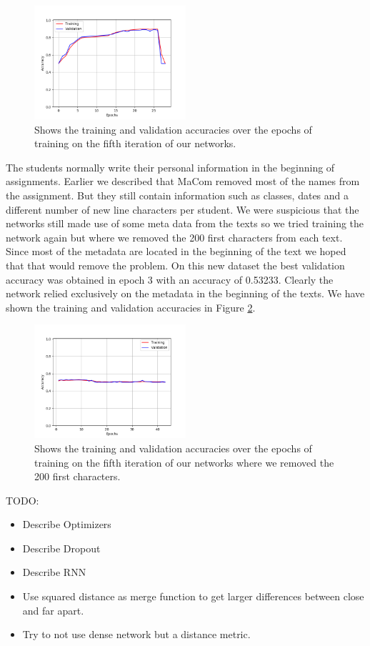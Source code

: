 \begin{figure}
    \centering
    \includegraphics[width=0.5\textwidth]{./pictures/experiments/network_5_accuracies.png}
    \caption{Shows the training and validation accuracies over the epochs of
        training on the fifth iteration of our networks.}
    \label{fig:network_5_accuracies}
\end{figure}

The students normally write their personal information in the beginning of
assignments. Earlier we described that MaCom removed most of the names from
the assignment. But they still contain information such as classes, dates and
a different number of new line characters per student. We were suspicious
that the networks still made use of some meta data from the texts so we tried
training the network again but where we removed the 200 first characters from
each text. Since most of the metadata are located in the beginning of the
text we hoped that that would remove the problem. On this new dataset the
best validation accuracy was obtained in epoch 3 with an accuracy of 0.53233.
Clearly the network relied exclusively on the metadata in the beginning of
the texts. We have shown the training and validation accuracies in Figure
\ref{fig:network_5_accuracies_2}.

\begin{figure}
    \centering
    \includegraphics[width=0.5\textwidth]{./pictures/experiments/network_5_accuracies_2.png}
    \caption{Shows the training and validation accuracies over the epochs of
        training on the fifth iteration of our networks where we removed the 200
        first characters.}
    \label{fig:network_5_accuracies_2}
\end{figure}

TODO:
\begin{itemize}
    \item Describe Optimizers
    \item Describe Dropout
    \item Describe RNN
    \item Use squared distance as merge function to get larger differences
        between close and far apart.
    \item Try to not use dense network but a distance metric.
\end{itemize}
